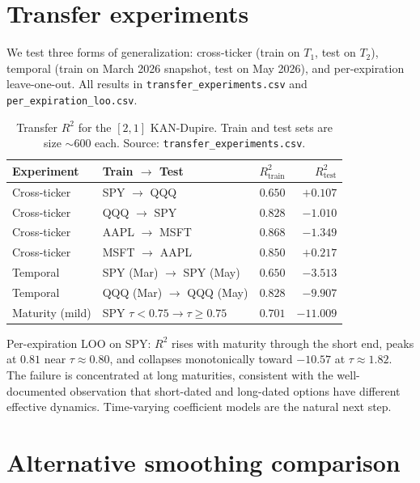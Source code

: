 \documentclass[10pt]{article}
\begin{document}
\section{Transfer experiments}\label{app:transfer}

We test three forms of generalization: cross-ticker (train on $T_1$, test on $T_2$), temporal (train on March 2026 snapshot, test on May 2026), and per-expiration leave-one-out. All results in \texttt{transfer\_experiments.csv} and \texttt{per\_expiration\_loo.csv}.

\begin{table}[h]
\centering\footnotesize
\caption{Transfer $R^2$ for the $[2,1]$ KAN-Dupire. Train and test sets are size $\sim\!600$ each. Source: \texttt{transfer\_experiments.csv}.}
\begin{tabular}{llrr}
\toprule
Experiment & Train $\to$ Test & $R^2_{\text{train}}$ & $R^2_{\text{test}}$ \\
\midrule
Cross-ticker & SPY $\to$ QQQ            & $0.650$ & $+0.107$ \\
Cross-ticker & QQQ $\to$ SPY            & $0.828$ & $-1.010$ \\
Cross-ticker & AAPL $\to$ MSFT          & $0.868$ & $-1.349$ \\
Cross-ticker & MSFT $\to$ AAPL          & $0.850$ & $+0.217$ \\
Temporal     & SPY (Mar) $\to$ SPY (May)& $0.650$ & $-3.513$ \\
Temporal     & QQQ (Mar) $\to$ QQQ (May)& $0.828$ & $-9.907$ \\
Maturity (mild) & SPY $\tau{<}0.75 \to \tau{\ge}0.75$ & $0.701$ & $-11.009$ \\
\bottomrule
\end{tabular}
\end{table}

Per-expiration LOO on SPY: $R^2$ rises with maturity through the short end, peaks at $0.81$ near $\tau{\approx}0.80$, and collapses monotonically toward $-10.57$ at $\tau{\approx}1.82$. The failure is concentrated at long maturities, consistent with the well-documented observation that short-dated and long-dated options have different effective dynamics. Time-varying coefficient models are the natural next step.

\section{Alternative smoothing comparison}\label{app:smoothing}
\end{document}
